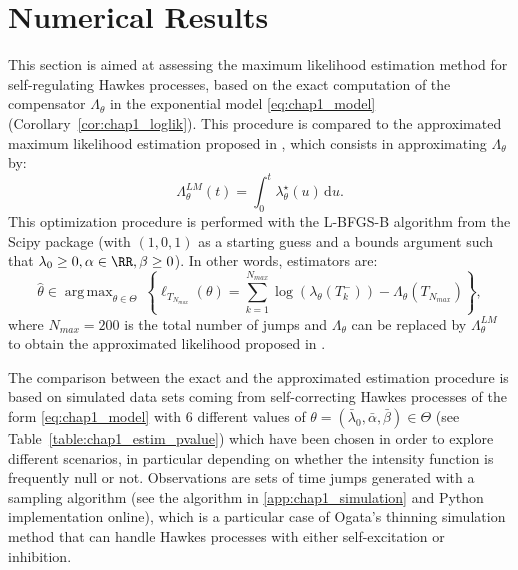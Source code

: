 \section{Numerical Results}\label{sec:chap1_num_res}

This section is aimed at assessing the maximum likelihood estimation method for self-regulating Hawkes processes, based on the exact computation of the compensator \(\Lambda_\theta\) in the exponential model \eqref{eq:chap1_model} (Corollary~\ref{cor:chap1_loglik}).
This procedure is compared to the approximated maximum likelihood estimation proposed in \textcite{Lemonnier2014}, which consists in approximating $\Lambda_\theta$ by:
\[
  \Lambda_\theta^{LM}(t) = \int_{0}^{t}{\lambda_\theta^\star(u)\,\mathrm{d}u}.
\]
This optimization procedure is performed with the L-BFGS-B algorithm from the Scipy package (with $(1,0,1)$ as a starting guess and a bounds argument such that $\lambda_0 \geq 0, \alpha \in \RR, \beta\geq 0$).
In other words, estimators are:
\[
  \hat \theta \in \operatorname{arg\,max}_{\theta \in \Theta} ~
  \left\{ \ell_{T_{N_{max}}}(\theta)
  =
  \sum_{k=1}^{N_{max}}{\log{(\lambda_\theta(T_k^-))}} - \Lambda_\theta(T_{N_{max}}) \right\},
\]
where
\(N_{max}=200\) is the total number of jumps
and \(\Lambda_\theta\) can be replaced by \(\Lambda_\theta^{LM}\) to obtain the approximated likelihood proposed in \textcite{Lemonnier2014}.

The comparison between the exact and the approximated estimation procedure is based on simulated data sets coming from self-correcting Hawkes processes of the form \eqref{eq:chap1_model} with 6 different values of \(\theta = (\bar \lambda_0, \bar \alpha, \bar \beta) \in \Theta\) (see Table~\ref{table:chap1_estim_pvalue}) which have been chosen in order to explore different scenarios, in particular depending on whether the intensity function is frequently null or not.
Observations are sets of time jumps generated with a sampling algorithm (see the algorithm in \ref{app:chap1_simulation} and Python implementation online), which is a particular case of Ogata's thinning simulation method \parencite{Ogata1981} that can handle Hawkes processes with either self-excitation or inhibition.

